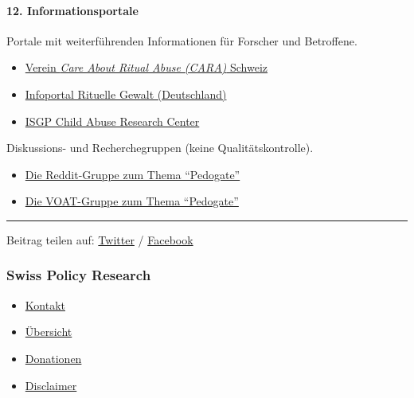 \hypertarget{12-informationsportale}{%
\paragraph{12. Informationsportale}\label{12-informationsportale}}

Portale mit weiterführenden Informationen für Forscher und Betroffene.

\begin{itemize}
\tightlist
\item
  \href{http://www.verein-cara.ch/}{Verein \emph{Care About Ritual Abuse
  (CARA)} Schweiz}
\item
  \href{https://www.infoportal-rg.de/}{Infoportal Rituelle Gewalt
  (Deutschland)}
\item
  \href{https://isgp-studies.com/scare}{ISGP Child Abuse Research
  Center}
\end{itemize}

Diskussions- und Recherchegruppen (keine Qualitätskontrolle).

\begin{itemize}
\tightlist
\item
  \href{https://www.reddit.com/r/PedoGate/}{Die Reddit-Gruppe zum Thema
  ``Pedogate''}
\item
  \href{https://voat.co/v/pizzagate/}{Die VOAT-Gruppe zum Thema
  ``Pedogate''}
\end{itemize}

\begin{center}\rule{0.5\linewidth}{\linethickness}\end{center}

Beitrag teilen auf:
\href{https://twitter.com/intent/tweet?url=https://swprs.org/geopolitik-und-paedokriminalitaet/}{Twitter}
/
\href{https://www.facebook.com/share.php?u=https://swprs.org/geopolitik-und-paedokriminalitaet/}{Facebook}

\hypertarget{swiss-policy-research}{%
\subsubsection{Swiss Policy Research}\label{swiss-policy-research}}

\begin{itemize}
\tightlist
\item
  \href{https://swprs.org/kontakt/}{Kontakt}
\item
  \href{https://swprs.org/uebersicht/}{Übersicht}
\item
  \href{https://swprs.org/donationen/}{Donationen}
\item
  \href{https://swprs.org/disclaimer/}{Disclaimer}
\end{itemize}

